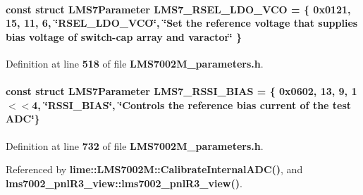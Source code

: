 \paragraph[{L\+M\+S7\+\_\+\+R\+S\+E\+L\+\_\+\+L\+D\+O\+\_\+\+V\+CO}]{\setlength{\rightskip}{0pt plus 5cm}const struct {\bf L\+M\+S7\+Parameter} L\+M\+S7\+\_\+\+R\+S\+E\+L\+\_\+\+L\+D\+O\+\_\+\+V\+CO = \{ 0x0121, 15, 11, 6, \char`\"{}\+R\+S\+E\+L\+\_\+\+L\+D\+O\+\_\+\+V\+C\+O\char`\"{}, \char`\"{}\+Set the reference voltage that supplies bias voltage of switch-\/cap array and varactor\char`\"{} \}\hspace{0.3cm}{\ttfamily [static]}}\label{LMS7002M__parameters_8h_a86dd7223f441c007eed2d69f2a85fab7}


Definition at line {\bf 518} of file {\bf L\+M\+S7002\+M\+\_\+parameters.\+h}.

\paragraph[{L\+M\+S7\+\_\+\+R\+S\+S\+I\+\_\+\+B\+I\+AS}]{\setlength{\rightskip}{0pt plus 5cm}const struct {\bf L\+M\+S7\+Parameter} L\+M\+S7\+\_\+\+R\+S\+S\+I\+\_\+\+B\+I\+AS = \{ 0x0602, 13, 9, 1$<$$<$4, \char`\"{}\+R\+S\+S\+I\+\_\+\+B\+I\+A\+S\char`\"{}, \char`\"{}\+Controls the reference bias current of the test A\+D\+C\char`\"{}\}\hspace{0.3cm}{\ttfamily [static]}}\label{LMS7002M__parameters_8h_ab2e31cc1a506f63a8c60625e4fe4ba9e}


Definition at line {\bf 732} of file {\bf L\+M\+S7002\+M\+\_\+parameters.\+h}.



Referenced by {\bf lime\+::\+L\+M\+S7002\+M\+::\+Calibrate\+Internal\+A\+D\+C()}, and {\bf lms7002\+\_\+pnl\+R3\+\_\+view\+::lms7002\+\_\+pnl\+R3\+\_\+view()}.

